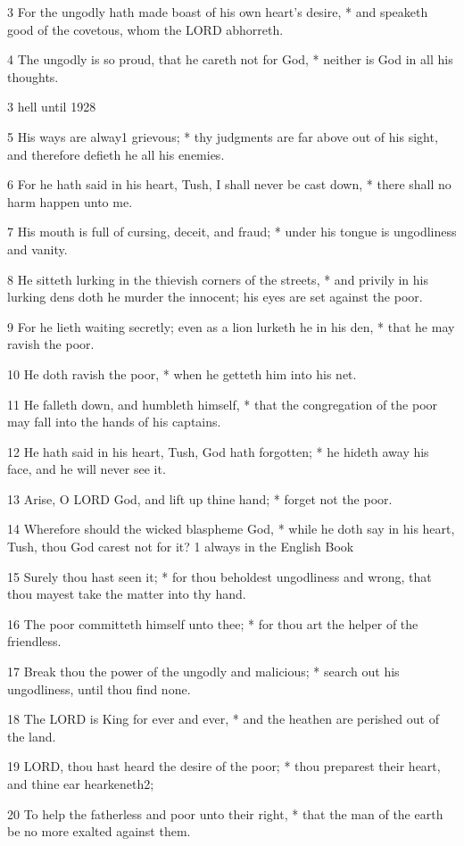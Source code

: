 3 For the ungodly hath made boast of his own heart's
desire, * and speaketh good of the covetous, whom the LORD
abhorreth.

4 The ungodly is so proud, that he careth not for God,
* neither is God in all his thoughts.

3 hell until
1928

5 His ways are alway1 grievous; * thy judgments are far above
out of his sight, and therefore defieth he all his enemies.

6 For he hath said in his heart, Tush, I shall never
be cast down, * there shall no harm happen unto me.

7 His mouth is full of cursing, deceit, and fraud; *
under his tongue is ungodliness and vanity.

8 He sitteth lurking in the thievish corners of the streets,
* and privily in his lurking dens doth he murder the innocent; his eyes
are set against the poor.

9 For he lieth waiting secretly; even as a lion lurketh
he in his den, * that he may ravish the poor.

10 He doth ravish the poor, * when he getteth him into
his net.

11 He falleth down, and humbleth himself, * that the
congregation of the poor may fall into the hands of his captains.

12 He hath said in his heart, Tush, God hath forgotten;
* he hideth away his face, and he will never see it.

13 Arise, O LORD God, and lift
up thine hand; * forget not the poor.

14 Wherefore should the wicked blaspheme God, * while
he doth say in his heart, Tush, thou God carest not for it? 1 always
in the English Book

15 Surely thou hast seen it; * for thou beholdest ungodliness
and wrong, that thou mayest take the matter into thy hand.

16 The poor committeth himself unto thee; * for thou
art the helper of the friendless.

17 Break thou the power of the ungodly and malicious;
* search out his ungodliness, until thou find none.

18 The LORD is King for ever and
ever, * and the heathen are perished out of the land.

19 LORD, thou hast heard the desire
of the poor; * thou preparest their heart, and thine ear hearkeneth2;

20 To help the fatherless and poor unto their right,
* that the man of the earth be no more exalted against them.

